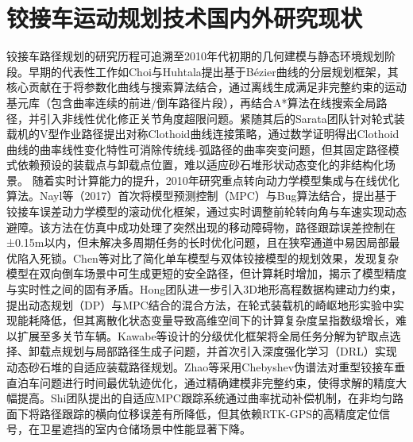 \documentclass[master,academic]{ysuthesis} %
\begin{document}
	\section{铰接车运动规划技术国内外研究现状}
	铰接车路径规划的研究历程可追溯至2010年代初期的几何建模与静态环境规划阶段。早期的代表性工作如Choi与Huhtala提出基于Bézier曲线的分层规划框架，其核心贡献在于将参数化曲线与搜索算法结合，通过离线生成满足非完整约束的运动基元库（包含曲率连续的前进/倒车路径片段），再结合A*算法在线搜索全局路径，并引入非线性优化修正关节角度超限问题。紧随其后的Sarata团队针对轮式装载机的V型作业路径提出对称Clothoid曲线连接策略，通过数学证明得出Clothoid曲线的曲率线性变化特性可消除传统线-弧路径的曲率突变问题，但其固定路径模式依赖预设的装载点与卸载点位置，难以适应砂石堆形状动态变化的非结构化场景。 随着实时计算能力的提升，2010年研究重点转向动力学模型集成与在线优化算法。Nayl等（2017）首次将模型预测控制（MPC）与Bug算法结合，提出基于铰接车误差动力学模型的滚动优化框架，通过实时调整前轮转向角与车速实现动态避障。该方法在仿真中成功处理了突然出现的移动障碍物，路径跟踪误差控制在±0.15m以内，但未解决多周期任务的长时优化问题，且在狭窄通道中易因局部最优陷入死锁。Chen等对比了简化单车模型与双体铰接模型的规划效果，发现复杂模型在双向倒车场景中可生成更短的安全路径，但计算耗时增加，揭示了模型精度与实时性之间的固有矛盾。Hong团队进一步引入3D地形高程数据构建动力约束，提出动态规划（DP）与MPC结合的混合方法，在轮式装载机的崎岖地形实验中实现能耗降低，但其离散化状态变量导致高维空间下的计算复杂度呈指数级增长，难以扩展至多关节车辆。Kawabe等设计的分级优化框架将全局任务分解为铲取点选择、卸载点规划与局部路径生成子问题，并首次引入深度强化学习（DRL）实现动态砂石堆的自适应装载路径规划。Zhao等采用Chebyshev伪谱法对重型铰接车垂直泊车问题进行时间最优轨迹优化，通过精确建模非完整约束，使得求解的精度大幅提高。Shi团队提出的自适应MPC跟踪系统通过曲率扰动补偿机制，在非均匀路面下将路径跟踪的横向位移误差有所降低，但其依赖RTK-GPS的高精度定位信号，在卫星遮挡的室内仓储场景中性能显著下降。
\end{document}
